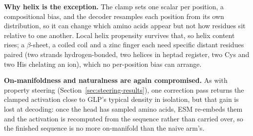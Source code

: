 \documentclass{article}
\begin{document}
\textbf{Why helix is the exception.} The clamp sets one scalar per position, a compositional
bias, and the decoder resamples each position from its own distribution, so it can change which
amino acids appear but not how residues sit relative to one another. Local helix propensity
survives that, so helix content rises; a $\beta$-sheet, a coiled coil and a zinc finger each
need specific distant residues paired (two strands hydrogen-bonded, two helices in heptad
register, two Cys and two His chelating an ion), which no per-position bias can arrange.

\textbf{On-manifoldness and naturalness are again compromised.} As with property steering
(Section~\ref{sec:steering-results}), one correction pass returns the clamped activation close
to GLP's typical density in isolation, but that gain is lost at decoding: once the head has
sampled amino acids, ESM re-embeds them and the activation is recomputed from the sequence
rather than carried over, so the finished sequence is no more on-manifold than the naive arm's.
\end{document}
